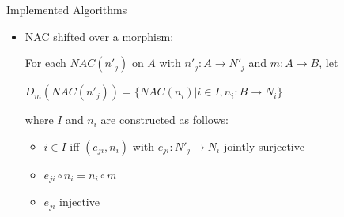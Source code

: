 \documentclass[xcolor=dvipsnames,pdf,11pt,handout]{beamer}
\newcommand{\bi}{\begin{itemize}}
\newcommand{\ei}{\end{itemize}}
\newcommand{\tm}{\item}
\newcommand{\rulesequence}{$p_0,\ldots,p_{n-1},p_n$}
\begin{document}

\begin{frame}[fragile]{Implemented Algorithms}{}

\bi
\tm NAC shifted over a morphism:
\centerline{}

For each $NAC(n'_j)$ on $A$ with $n'_j : A \rightarrow N'_j$ and $m : A \rightarrow B$, let 

\begin{center}
$D_m(NAC(n'_j)) = \{ NAC(n_i)|i \in I, n_i : B \rightarrow N_i \}$
\end{center}

where $I$ and $n_i$ are constructed as follows:

\begin{itemize}
\item $i \in I$ iff $(e_{ji}, n_i)$ with $e_{ji} : N'_j \rightarrow N_i$ jointly surjective 
\item $e_{ji} \circ n_i = n_i \circ m$
\item $e_{ji}$ injective
\end{itemize}
\ei

\end{frame}
\end{document}
